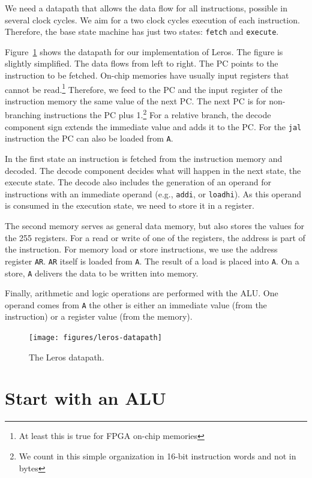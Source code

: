 \documentclass[%
    10pt,
    headinclude, footexclude,
    openright, %
    notitlepage,
    cleardoubleempty,
    headsepline,
    pointlessnumbers,
    bibtotoc, idxtotoc,
    ]{scrbook}
\newcommand{\code}[1]{{\lstinline[basicstyle=\small\ttfamily]{#1}}}
\begin{document}
We need a datapath that allows the data flow for all instructions, possible in several
clock cycles. We aim for a two clock cycles execution of each instruction.
Therefore, the base state machine has just two states: \code{fetch} and \code{execute}.

Figure~\ref{fig:leros-datapath} shows the datapath for our implementation of Leros.
The figure is slightly simplified.
The data flows from left to right. The PC points to the instruction to be fetched.
On-chip memories have usually input registers that cannot be read.\footnote{At least
this is true for FPGA on-chip memories} Therefore, we feed to the PC and the input register
of the instruction memory the same value of the next PC. The next PC is for non-branching
instructions the PC plus 1.\footnote{We count in this simple organization in 16-bit instruction
words and not in bytes} For a relative branch, the decode component sign extends the immediate
value and adds it to the PC. For the \code{jal} instruction the PC can also be loaded from \code{A}.

In the first state an instruction is fetched from the instruction memory and decoded.
The decode component decides what will happen in the next state, the execute state.
The decode also includes the generation of an operand for instructions with an immediate operand
(e.g., \code{addi}, or \code{loadhi}). As this operand is consumed in the execution state,
we need to store it in a register.

The second memory serves as general data memory, but also stores the values for the
255 registers. For a read or write of one of the registers, the address is part of the instruction.
For memory load or store instructions, we use the address register \code{AR}.
\code{AR} itself is loaded from \code{A}. The result of a load is placed into \code{A}.
On a store, \code{A} delivers the data to be written into memory.

Finally, arithmetic and logic operations are performed with the ALU. One operand
comes from \code{A} the other is either an immediate value (from the instruction)
or a register value (from the memory).

\begin{figure}
  \centering
  \texttt{[image: figures/leros-datapath]}
  \caption{The Leros datapath.}
  \label{fig:leros-datapath}
\end{figure}

\section{Start with an ALU}
\end{document}
